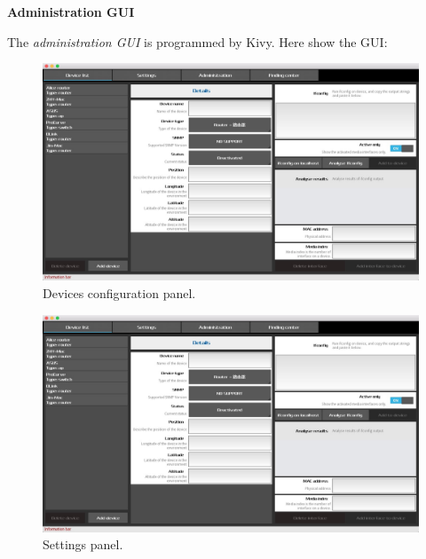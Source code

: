 
\textbf{Administration GUI}

The \textit{administration GUI} is programmed by Kivy. Here show the GUI:

\begin{figure}[!ht]
	\includegraphics[width=\textwidth]{images/gui1}
	\caption{Devices configuration panel.}
\end{figure}

\begin{figure}[!ht]
	\includegraphics[width=\textwidth]{images/gui1}
	\caption{Settings panel.}
\end{figure}

